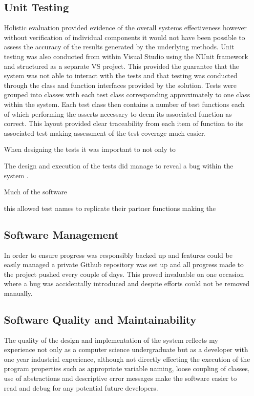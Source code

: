 \subsection{Unit Testing}
Holistic evaluation provided evidence of the overall systems effectiveness however without verification of individual components it would not have been possible to assess the accuracy of the results generated by the underlying methods. Unit testing was also conducted from within Visual Studio using the NUnit framework and structured as a separate VS project. This provided the guarantee that the system was not able to interact with the tests and that testing was conducted through the class and function interfaces provided by the solution. Tests were grouped into classes with each test class corresponding approximately to one class within the system. Each test class then contains a number of test functions each of which performing the asserts necessary to deem its associated function as correct. This layout provided clear traceability from each item of function to its associated test making assessment of the test coverage much easier.

When designing the tests it was important to not only to 

The design and execution of the tests did manage to reveal a bug within the system . 

Much of the software

 this allowed test names to replicate their partner functions making the 


\subsection{Software Management}
In order to ensure progress was responsibly backed up and features could be easily managed a private Github repository was set up and all progress made to the project pushed every couple of days. This proved invaluable on one occasion where a bug was accidentally introduced and despite efforts could not be removed manually. 
 

\subsection{Software Quality and Maintainability}
The quality of the design and implementation of the system reflects my experience not only as a computer science undergraduate but as a developer with one year industrial experience, although not directly effecting the execution of the program properties such as appropriate variable naming, loose coupling of classes, use of abstractions and descriptive error messages make the software easier to read and debug for any potential future developers. \\

